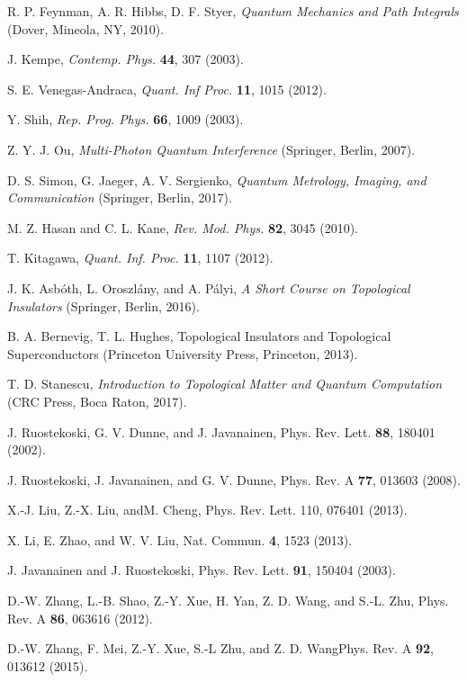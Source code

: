 \documentclass[twocolumn,amsmath, amssymb, superscriptaddress, pra]{revtex4}
\begin{document}
\begin{thebibliography}{99}
 R. P. Feynman,  A. R. Hibbs, D. F. Styer, \emph{Quantum Mechanics
    and Path Integrals} (Dover, Mineola, NY, 2010).

 J. Kempe, \emph{Contemp. Phys.} \textbf{44}, 307 (2003).

 S. E. Venegas-Andraca, \emph{Quant. Inf Proc.} \textbf{11},
    1015 (2012).

 Y. Shih, \emph{Rep. Prog. Phys.} \textbf{66}, 1009 (2003).

 Z. Y. J. Ou, \emph{Multi-Photon Quantum Interference} (Springer,
    Berlin, 2007).

 D. S. Simon, G. Jaeger, A. V. Sergienko, \emph{Quantum Metrology,
    Imaging, and Communication} (Springer, Berlin, 2017).

 M. Z. Hasan and C. L. Kane, \emph{Rev. Mod. Phys.}
    \textbf{82}, 3045 (2010).

 T. Kitagawa, \emph{Quant. Inf. Proc.} \textbf{11}, 1107
    (2012).

 J. K. Asb\'oth,  L. Oroszl\'any, and  A. P\'alyi, \emph{A
    Short Course on Topological Insulators} (Springer, Berlin, 2016).

 B. A. Bernevig, T. L. Hughes, Topological Insulators and
    Topological Superconductors (Princeton University Press, Princeton,
    2013).

 T. D. Stanescu, \emph{Introduction to Topological Matter and
    Quantum Computation} (CRC Press, Boca Raton, 2017).

 J. Ruostekoski, G. V. Dunne, and J. Javanainen, Phys. Rev.
    Lett. \textbf{88}, 180401 (2002).

 J. Ruostekoski, J. Javanainen, and G. V. Dunne, Phys. Rev. A
    \textbf{77}, 013603 (2008).

 X.-J. Liu, Z.-X. Liu, andM. Cheng, Phys. Rev. Lett. 110, 076401
    (2013).

 X. Li, E. Zhao, and W. V. Liu, Nat. Commun. \textbf{4}, 1523
    (2013).

 J. Javanainen and J. Ruostekoski, Phys. Rev. Lett. \textbf{91},
    150404 (2003).

 D.-W. Zhang, L.-B. Shao, Z.-Y. Xue, H. Yan, Z. D. Wang, and
    S.-L. Zhu, Phys. Rev. A \textbf{86}, 063616 (2012).

D.-W. Zhang, F. Mei, Z.-Y. Xue, S.-L Zhu, and Z. D. WangPhys.
    Rev. A \textbf{92}, 013612 (2015).


\end{thebibliography}
\end{document}
